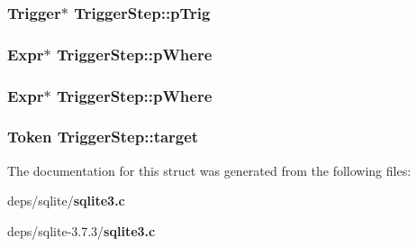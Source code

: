 \subsubsection{\setlength{\rightskip}{0pt plus 5cm}\bf{Trigger}$\ast$ \bf{Trigger\-Step::p\-Trig}}\label{structTriggerStep_adc2cab6dbb9838c72be8ec659f2933e}


\subsubsection{\setlength{\rightskip}{0pt plus 5cm}\bf{Expr}$\ast$ \bf{Trigger\-Step::p\-Where}}\label{structTriggerStep_0ef2c466f4c85ef39736e2bdbedc6957}


\subsubsection{\setlength{\rightskip}{0pt plus 5cm}\bf{Expr}$\ast$ \bf{Trigger\-Step::p\-Where}}\label{structTriggerStep_0ef2c466f4c85ef39736e2bdbedc6957}


\subsubsection{\setlength{\rightskip}{0pt plus 5cm}\bf{Token} \bf{Trigger\-Step::target}}\label{structTriggerStep_7df009180f7176888eb16951d80ef720}




The documentation for this struct was generated from the following files:\begin{CompactItemize}
\item 
deps/sqlite/\bf{sqlite3.c}\item 
deps/sqlite-3.7.3/\bf{sqlite3.c}\end{CompactItemize}
